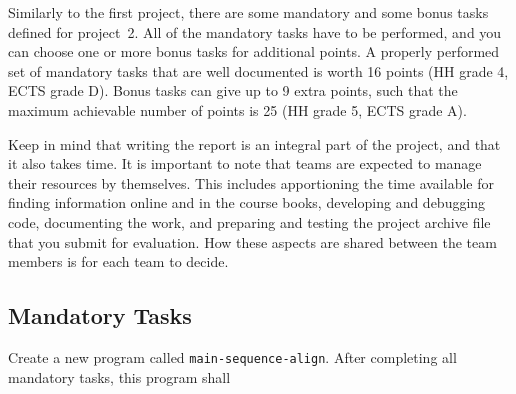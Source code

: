 \documentclass[a4paper,10pt]{article}
\begin{document}
Similarly to the first project, there are some mandatory and some bonus tasks defined for project~2.
All of the mandatory tasks have to be performed, and you can choose one or more bonus tasks for additional points.
A properly performed set of mandatory tasks that are well documented is worth 16 points (HH grade 4, ECTS grade D).
Bonus tasks can give up to 9 extra points, such that the maximum achievable number of points is 25 (HH grade 5, ECTS grade A).

Keep in mind that writing the report is an integral part of the project, and that it also takes time.
It is important to note that teams are expected to manage their resources by themselves.
This includes apportioning the time available for finding information online and in the course books, developing and debugging code, documenting the work, and preparing and testing the project archive file that you submit for evaluation.
How these aspects are shared between the team members is for each team to decide.

\subsection{Mandatory Tasks}

Create a new program called \texttt{main-sequence-align}.
After completing all mandatory tasks, this program shall
\end{document}
